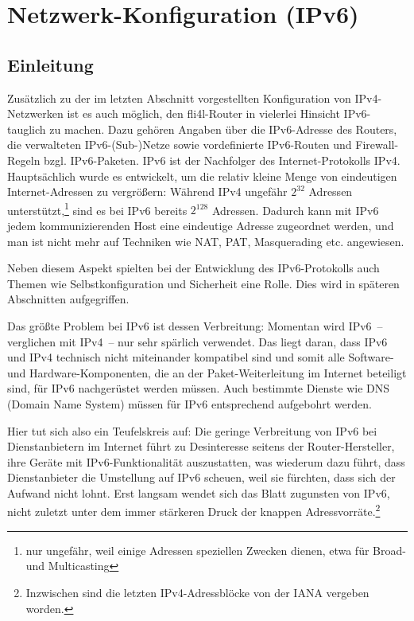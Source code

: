 \section{Netzwerk-Konfiguration (IPv6)}

\subsection{Einleitung}

Zusätzlich zu der im letzten Abschnitt vorgestellten Konfiguration von
IPv4-Netzwerken ist es auch möglich, den fli4l-Router in vielerlei Hinsicht
IPv6-tauglich zu machen. Dazu gehören Angaben über die IPv6-Adresse des
Routers, die verwalteten IPv6-(Sub-)Netze sowie vordefinierte IPv6-Routen und
Firewall-Regeln bzgl. IPv6-Paketen. IPv6 ist der Nachfolger des
Internet-Protokolls IPv4. Hauptsächlich wurde es entwickelt, um die relativ
kleine Menge von eindeutigen Internet-Adressen zu vergrößern: Während IPv4
ungefähr \(2^{32}\) Adressen unterstützt,\footnote{nur ungefähr, weil einige
Adressen speziellen Zwecken dienen, etwa für Broad- und Multicasting} sind es
bei IPv6 bereits \(2^{128}\) Adressen. Dadurch kann mit IPv6 jedem
kommunizierenden Host eine eindeutige Adresse zugeordnet werden, und man ist
nicht mehr auf Techniken wie NAT, PAT, Masquerading etc. angewiesen.

Neben diesem Aspekt spielten bei der Entwicklung des IPv6-Protokolls auch
Themen wie Selbstkonfiguration und Sicherheit eine Rolle. Dies wird in späteren
Abschnitten aufgegriffen.

Das größte Problem bei IPv6 ist dessen Verbreitung: Momentan wird IPv6~--
verglichen mit IPv4~-- nur sehr spärlich verwendet. Das liegt daran, dass IPv6
und IPv4 technisch nicht miteinander kompatibel sind und somit alle Software-
und Hardware-Komponenten, die an der Paket-Weiterleitung im Internet beteiligt
sind, für IPv6 nachgerüstet werden müssen. Auch bestimmte Dienste wie DNS
(Domain Name System) müssen für IPv6 entsprechend aufgebohrt werden.

Hier tut sich also ein Teufelskreis auf: Die geringe Verbreitung von IPv6 bei
Dienstanbietern im Internet führt zu Desinteresse seitens der
Router-Hersteller, ihre Geräte mit IPv6-Funktionalität auszustatten, was
wiederum dazu führt, dass Dienstanbieter die Umstellung auf IPv6 scheuen, weil
sie fürchten, dass sich der Aufwand nicht lohnt. Erst langsam wendet sich das
Blatt zugunsten von IPv6, nicht zuletzt unter dem immer stärkeren Druck der
knappen Adressvorräte.\footnote{Inzwischen sind die letzten IPv4-Adressblöcke
von der IANA vergeben worden.}

